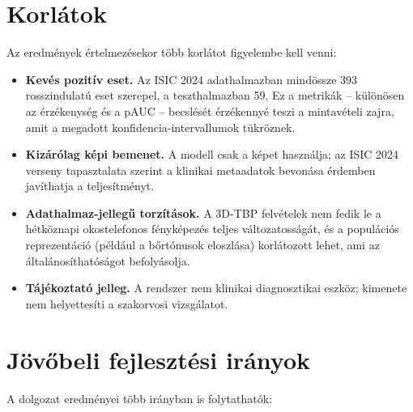 \section{Korlátok}

Az eredmények értelmezésekor több korlátot figyelembe kell venni:

\begin{itemize}
  \item \textbf{Kevés pozitív eset.} Az ISIC 2024 adathalmazban mindössze 393
  rosszindulatú eset szerepel, a teszthalmazban 59. Ez a metrikák -- különösen
  az érzékenység és a pAUC -- becslését érzékennyé teszi a mintavételi zajra,
  amit a megadott konfidencia-intervallumok tükröznek.
  \item \textbf{Kizárólag képi bemenet.} A modell csak a képet használja; az ISIC
  2024 verseny tapasztalata szerint a klinikai metaadatok bevonása érdemben
  javíthatja a teljesítményt.
  \item \textbf{Adathalmaz-jellegű torzítások.} A 3D-TBP felvételek nem fedik le a
  hétköznapi okostelefonos fényképezés teljes változatosságát, és a populációs
  reprezentáció (például a bőrtónusok eloszlása) korlátozott lehet, ami az
  általánosíthatóságot befolyásolja.
  \item \textbf{Tájékoztató jelleg.} A rendszer nem klinikai diagnosztikai
  eszköz; kimenete nem helyettesíti a szakorvosi vizsgálatot.
\end{itemize}

\section{Jövőbeli fejlesztési irányok}

A dolgozat eredményei több irányban is folytathatók:

